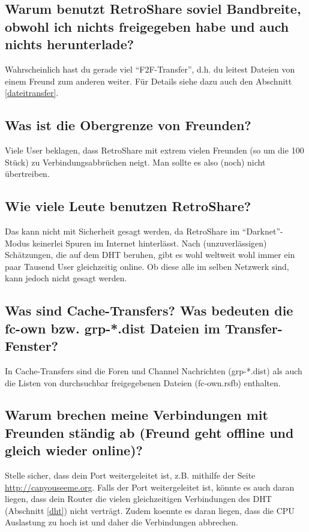 {\subsection{Warum benutzt RetroShare soviel Bandbreite, obwohl ich nichts freigegeben habe und auch nichts herunterlade?}
Wahrscheinlich hast du gerade viel ``F2F-Transfer'', d.h. du leitest Dateien von einem Freund zum anderen weiter. Für Details siehe dazu auch den Abschnitt \ref{dateitransfer}.

\subsection{Was ist die Obergrenze von Freunden?}
Viele User beklagen, dass RetroShare mit extrem vielen Freunden (so um die 100 Stück) zu Verbindungsabbrüchen neigt. Man sollte es also (noch) nicht übertreiben.

\subsection{Wie viele Leute benutzen RetroShare?}
Das kann nicht mit Sicherheit gesagt werden, da RetroShare im ``Darknet''-Modus keinerlei Spuren im Internet hinterlässt. Nach (unzuverlässigen) Schätzungen, die auf dem DHT beruhen, gibt es wohl weltweit wohl immer ein paar Tausend User gleichzeitig online. Ob diese alle im selben Netzwerk sind, kann jedoch nicht gesagt werden.

\subsection{Was sind Cache-Transfers? Was bedeuten die fc-own bzw. grp-*.dist Dateien im Transfer-Fenster?}
In Cache-Transfers sind die Foren und Channel Nachrichten (grp-*.dist) als auch die Listen von durchsuchbar freigegebenen Dateien (fc-own.rsfb) enthalten.

\subsection{Warum brechen meine Verbindungen mit Freunden ständig ab (Freund geht offline und gleich wieder online)?}
Stelle sicher, dass dein Port weitergeleitet ist, z.B. mithilfe der Seite \url{http://canyouseeme.org}. Falls der Port weitergeleitet ist, könnte es auch daran liegen, dass dein Router die vielen gleichzeitigen Verbindungen des DHT (Abschnitt \ref{dht}) nicht verträgt. Zudem koennte es daran liegen, dass die CPU Auslastung zu hoch ist und daher die Verbindungen abbrechen.

}
